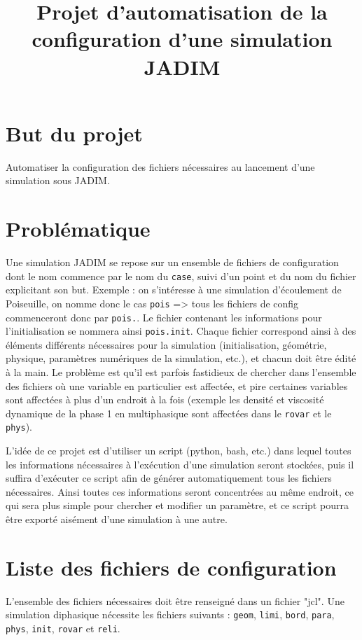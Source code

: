 \documentclass{article} %
\title{Projet d'automatisation de la configuration d'une simulation JADIM}
\author{}
\date{}
\newcommand{\code}[1]{\colorbox{light-gray}{\texttt{#1}}}
\begin{document}
\maketitle

\section{But du projet}
Automatiser la configuration des fichiers nécessaires au lancement d'une simulation sous JADIM.

\section{Problématique}
Une simulation JADIM se repose sur un ensemble de fichiers de configuration dont le nom commence par le nom du \code{case}, suivi d'un point et du nom du fichier explicitant son but. Exemple : on s'intéresse à une simulation d'écoulement de Poiseuille, on nomme donc le cas \code{pois} => tous les fichiers de config commenceront donc par \code{pois.}. Le fichier contenant les informations pour l'initialisation se nommera ainsi \code{pois.init}. Chaque fichier correspond ainsi à des éléments différents nécessaires pour la simulation (initialisation, géométrie, physique, paramètres numériques de la simulation, etc.), et chacun doit être édité à la main. Le problème est qu'il est parfois fastidieux de chercher dans l'ensemble des fichiers où une variable en particulier est affectée, et pire certaines variables sont affectées à plus d'un endroit à la fois (exemple les densité et viscosité dynamique de la phase 1 en multiphasique sont affectées dans le \code{rovar} et le \code{phys}).

L'idée de ce projet est d'utiliser un script (python, bash, etc.) dans lequel toutes les informations nécessaires à l'exécution d'une simulation seront stockées, puis il suffira d'exécuter ce script afin de générer automatiquement tous les fichiers nécessaires. Ainsi toutes ces informations seront concentrées au même endroit, ce qui sera plus simple pour chercher et modifier un paramètre, et ce script pourra être exporté aisément d'une simulation à une autre.

\section{Liste des fichiers de configuration}
L'ensemble des fichiers nécessaires doit être renseigné dans un fichier "jcl". Une simulation diphasique nécessite les fichiers suivants : \code{geom}, \code{limi}, \code{bord}, \code{para}, \code{phys}, \code{init}, \code{rovar} et \code{reli}.
\end{document}
